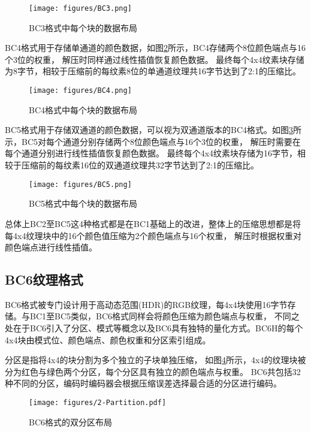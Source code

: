 \begin{figure}[htbp]
    \centering
    \texttt{[image: figures/BC3.png]}
    \caption{BC3格式中每个块的数据布局\cite{BC1-5}}
    \label{fig:BC3}
\end{figure}

BC4格式用于存储单通道的颜色数据，如图\ref{fig:BC4}所示，BC4存储两个8位颜色端点与16个3位的权重，
解压时同样通过线性插值恢复颜色数据。
最终每个4x4纹素块存储为8字节，相较于压缩前的每纹素8位的单通道纹理共16字节达到了2:1的压缩比。

\begin{figure}[htbp]
    \centering
    \texttt{[image: figures/BC4.png]}
    \caption{BC4格式中每个块的数据布局\cite{BC1-5}}
    \label{fig:BC4}
\end{figure}

BC5格式用于存储双通道的颜色数据，可以视为双通道版本的BC4格式。如图\ref{fig:BC5}所示，BC5对每个通道分别存储两个8位颜色端点与16个3位的权重，
解压时需要在每个通道分别进行线性插值恢复颜色数据。
最终每个4x4纹素块存储为16字节，相较于压缩前的每纹素16位的双通道纹理共32字节达到了2:1的压缩比。

\begin{figure}[htbp]
    \centering
    \texttt{[image: figures/BC5.png]}
    \caption{BC5格式中每个块的数据布局\cite{BC1-5}}
    \label{fig:BC5}
\end{figure}

总体上BC2至BC5这4种格式都是在BC1基础上的改进，整体上的压缩思想都是将每4x4纹理块中的16个颜色值压缩为2个颜色端点与16个权重，
解压时根据权重对颜色端点进行线性插值。

\subsection{BC6纹理格式}

BC6格式被专门设计用于高动态范围(HDR)的RGB纹理，每4x4块使用16字节存储。与BC1至BC5类似，BC6格式同样会将颜色压缩为颜色端点与权重，
不同之处在于BC6引入了分区、模式等概念以及BC6具有独特的量化方式。BC6H的每个4x4块由模式位、颜色端点、颜色权重和分区索引组成。

分区是指将4x4的块分割为多个独立的子块单独压缩，
如图\ref{fig:2-Partition}所示，4x4的纹理块被分为红色与绿色两个分区，每个分区具有独立的颜色端点与权重。
BC6共包括32种不同的分区，编码时编码器会根据压缩误差选择最合适的分区进行编码。

\begin{figure}[htbp]
    \centering
    \texttt{[image: figures/2-Partition.pdf]}
    \caption{BC6格式的双分区布局\cite{ASTC}}
    \label{fig:2-Partition}
\end{figure}

